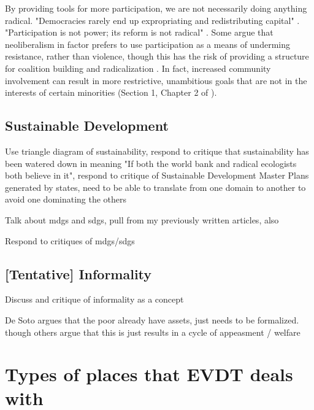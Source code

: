 By providing tools for more participation, we are not necessarily doing anything radical. "Democracies rarely end up expropriating and redistributing capital" \cite{fainsteinSpatialJusticePlanning2016}. "Participation is not power; its reform is not radical" \cite{marcuseThreeHistoricCurrents2016}. Some argue that neoliberalism in factor prefers to use participation as a means of underming resistance, rather than violence, though this has the risk of providing a structure for coalition building and radicalization \cite{miraftabInsurgentPlanningSituating2016}. In fact, increased community involvement can result in more restrictive, unambitious goals that are not in the interests of certain minorities (Section 1, Chapter 2 of \cite{robinsonDecisionmakingUrbanPlanning1972}).

\subsection{Sustainable Development}

Use triangle diagram of sustainability, respond to critique that sustainability has been watered down in meaning "If both the world bank and radical ecologists both believe in it", respond to critique of Sustainable Development Master Plans generated by states, need to be able to translate from one domain to another to avoid one dominating the others \cite{campbellGreenCitiesGrowing2016}

Talk about \acp{mdg} and \acp{sdg}, pull from my previously written articles, also \cite{unitednationsWhoWillBe2013}

Respond to critiques of \acp{mdg}/\acp{sdg} \cite{alstonShipsPassingNight2005, reddyGlobalDevelopmentGoals2008}

\subsection{[Tentative] Informality}
Discuss and critique of informality as a concept \cite{royUrbanInformalityProduction2016}

De Soto argues that the poor already have assets, just needs to be formalized. \cite{sotoMysteryCapitalWhy2003} though others argue that this is just results in a cycle of appeasment / welfare \cite{hollandForbearanceRedistributionPolitics2017}


\section{Types of places that EVDT deals with}

